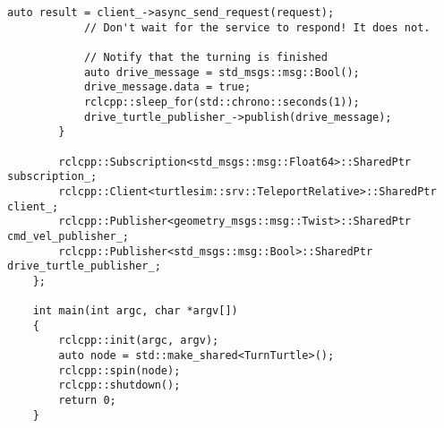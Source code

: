 \begin{lstlisting}[caption={\texttt{/turn\_turtle} source code}, label={lst:turn_turtle_source_code}]
            auto result = client_->async_send_request(request);
            // Don't wait for the service to respond! It does not.
    
            // Notify that the turning is finished
            auto drive_message = std_msgs::msg::Bool();
            drive_message.data = true;
            rclcpp::sleep_for(std::chrono::seconds(1));
            drive_turtle_publisher_->publish(drive_message);
        }
    
        rclcpp::Subscription<std_msgs::msg::Float64>::SharedPtr subscription_;
        rclcpp::Client<turtlesim::srv::TeleportRelative>::SharedPtr client_;
        rclcpp::Publisher<geometry_msgs::msg::Twist>::SharedPtr cmd_vel_publisher_;
        rclcpp::Publisher<std_msgs::msg::Bool>::SharedPtr drive_turtle_publisher_;
    };
    
    int main(int argc, char *argv[])
    {
        rclcpp::init(argc, argv);
        auto node = std::make_shared<TurnTurtle>();
        rclcpp::spin(node);
        rclcpp::shutdown();
        return 0;
    }
    
\end{lstlisting}


